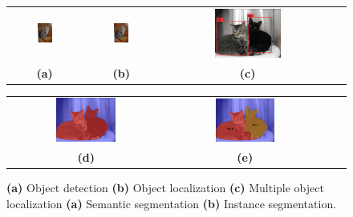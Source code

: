 \begin{figure} [h]
	\centering
	\begin{tabular}{cccc}
		\includegraphics[width=0.223\textwidth]{archivos/cat_classification.png} &
		\includegraphics[width=0.223\textwidth]{archivos/cat_localization.png} &
		\includegraphics[width=0.4\textwidth]{archivos/cats_localization.png} \\
		\textbf{(a)}  & \textbf{(b)} & \textbf{(c)}  \\[6pt]
	\end{tabular}
	\begin{tabular}{cccc}
		\includegraphics[width=0.4\textwidth]{archivos/cats_semantic_segmentation.png} &
		\includegraphics[width=0.4\textwidth]{archivos/cats_instance_segmentation.png} \\
		\textbf{(d)}  & \textbf{(e)}  \\[6pt]
	\end{tabular}
	\caption{ \textbf{(a)} Object detection
		\textbf{(b)} Object localization
		\textbf{(c)} Multiple object localization
		\textbf{(a)} Semantic segmentation
		\textbf{(b)} Instance segmentation.}
	\label{fig:object_recognition}
\end{figure}

